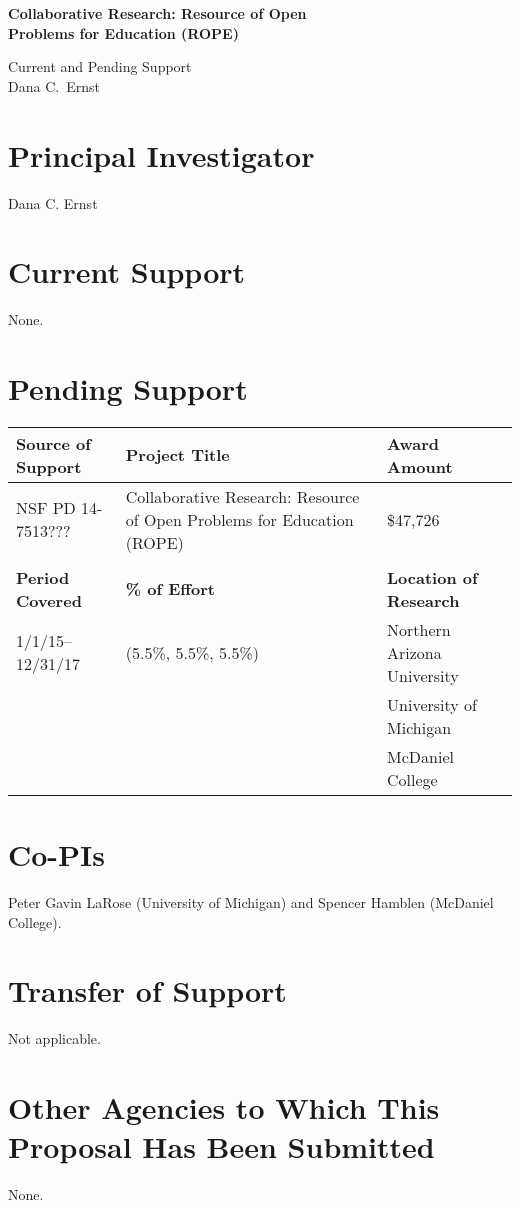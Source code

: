 \documentclass[11pt]{article}
\begin{document}
\begin{center}
{\Large \textbf{Collaborative Research: Resource of Open\\
Problems for Education (ROPE)}}

\bigskip

{\Large Current and Pending Support}\\
\smallskip
Dana C.~Ernst
\end{center}

\thispagestyle{empty}

\section{Principal Investigator}

\noindent Dana C. Ernst

\section{Current Support}

\noindent None.

\section{Pending Support}

\begin{tabularx}{6.4in}{@{}lXl}
\hline
\textbf{Source of Support} & \textbf{Project Title} & \textbf{Award Amount} \\
\hline
NSF PD 14-7513??? & Collaborative Research: Resource of Open Problems for Education (ROPE) & \$47,726\\
\\
\hline
\textbf{Period Covered} & \textbf{\% of Effort} & \textbf{Location of Research} \\
\hline
1/1/15--12/31/17 \ \ & (5.5\%, 5.5\%, 5.5\%) \ & Northern Arizona University \\ 
&& University of Michigan \\
&& McDaniel College\\
\end{tabularx}

\section{Co-PIs}

\noindent Peter Gavin LaRose (University of Michigan) and Spencer Hamblen (McDaniel College).

\section{Transfer of Support}

\noindent Not applicable.

\section{Other Agencies to Which This Proposal Has Been Submitted}

None.
\end{document}
